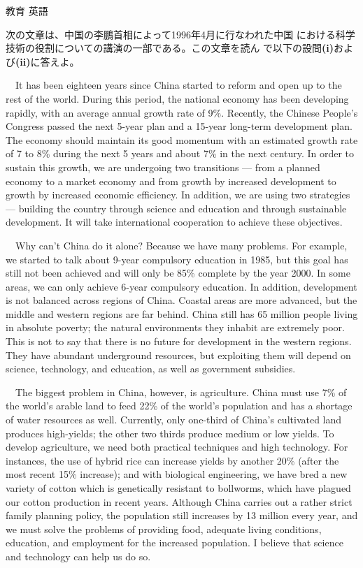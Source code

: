 \documentclass[fleqn]{jbook}
\begin{document}
\begin{question}{教育 英語}{}
\begin{subquestions}
\SubQuestion
  次の文章は、中国の李鵬首相によって1996年4月に行なわれた中国
  における科学技術の役割についての講演の一部である。この文章を読ん
  で以下の設問{\bf(i)}および{\bf(ii)}に答えよ。

\baselineskip=12pt

  　It has been eighteen years since China started to reform and open 
  up to the rest of the world. During this period, the national
  economy has been developing rapidly, with an average annual
  growth rate of 9\%. Recently, the Chinese People's Congress passed
  the next 5-year plan and a 15-year long-term development
  plan. The economy should maintain its good momentum with an
  estimated growth rate of 7 to 8\% during the next 5 years and
  about 7\% in the next century. In order to sustain this growth,
  we are undergoing two transitions --- from a planned economy to a
  market economy and from growth by increased development to
  growth by increased economic efficiency. In addition, we are
  using two strategies --- building the country through science and
  education and through sustainable development. It will take
  international cooperation to achieve these objectives.

  　Why can't China do it alone? Because we have many
  problems. For example, we started to talk about 9-year
  compulsory education in 1985, but this goal has still not been
  achieved and will only be 85\% complete by the year 2000. In some 
  areas, we can only achieve 6-year compulsory education. In
  addition, development is not balanced across regions of
  China. Coastal areas are more advanced, but the middle and
  western regions are far behind. China still has 65 million
  people living in absolute poverty; the natural environments they 
  inhabit are extremely poor. This is not to say that there is no
  future for development in the western regions. They have
  abundant underground resources, but exploiting them will depend
  on science, technology, and education, as well as government
  subsidies. 

  　The biggest problem in China, however, is agriculture. China
  must use 7\% of the world's arable land to feed 22\% of the
  world's population and has a shortage of water resources as
  well. Currently, only one-third of China's cultivated land
  produces high-yields; the other two thirds produce medium or low 
  yields. To develop agriculture, we need both practical
  techniques and high technology. For instances, the use of hybrid 
  rice can increase yields by another 20\% (after the most recent
  15\% increase); and with biological engineering, we have bred a
  new variety of cotton which is genetically resistant to
  bollworms, which have plagued our cotton production in recent
  years. Although China carries out a rather strict family
  planning policy, the population still increases by 13 million
  every year, and we must solve the problems of providing food,
  adequate living conditions, education, and employment for the
  increased population. I believe that science and technology can
  help us do so. 


\end{subquestions}
\end{question}
\end{document}
